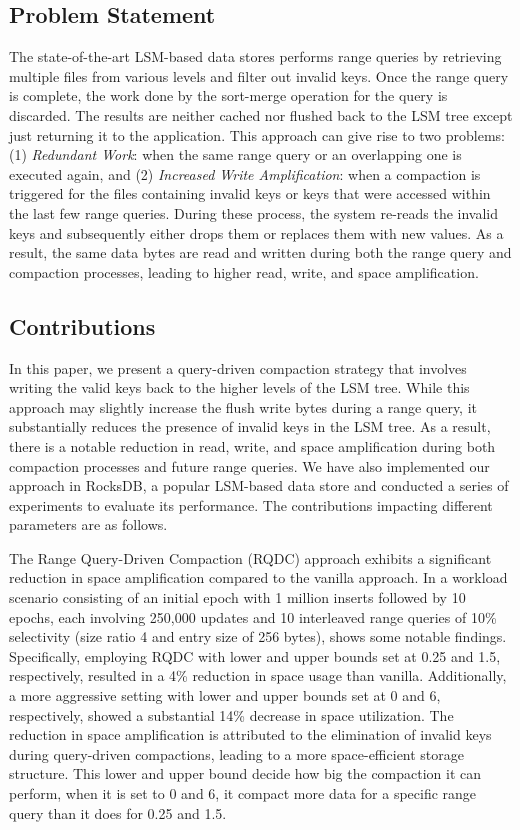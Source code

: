 \subsection{Problem Statement}
The state-of-the-art LSM-based data stores performs range queries by retrieving multiple files from various levels and 
filter out invalid keys. Once the range query is complete, the work done by the sort-merge operation for the query is 
discarded. The results are neither cached nor flushed back to the LSM tree except just returning it to the application. This 
approach can give rise to two problems: (1) \textit{Redundant Work}: when the same range query or 
an overlapping one is executed again, and (2) \textit{Increased Write Amplification}: when a compaction is triggered 
for the files containing invalid keys or keys that were accessed within the last few range queries. During these process, 
the system re-reads the invalid keys and subsequently either drops them or replaces them with new values. As a result, 
the same data bytes are read and written during both the range query and compaction processes, leading to higher read, 
write, and space amplification.


\subsection{Contributions}
In this paper, we present a query-driven compaction strategy that involves writing the valid keys back to the higher 
levels of the LSM tree. While this approach may slightly increase the flush write bytes during a range query, it 
substantially reduces the presence of invalid keys in the LSM tree. As a result, there is a notable reduction in read, 
write, and space amplification during both compaction processes and future range queries. We have also implemented our
approach in RocksDB, a popular LSM-based data store and conducted a series of experiments to evaluate its performance.
The contributions impacting different parameters are as follows.

The Range Query-Driven Compaction (RQDC) approach exhibits a significant reduction in space amplification compared to 
the vanilla approach. In a workload scenario consisting of an initial epoch with 1 million inserts followed by 10 
epochs, each involving 250,000 updates and 10 interleaved range queries of 10\% selectivity (size ratio 4 and entry size of 256 bytes), 
shows some notable findings. Specifically, employing RQDC with lower and upper bounds set at 0.25 and 1.5, 
respectively, resulted in a 4\% reduction in space usage than vanilla. Additionally, a more aggressive setting with lower and upper 
bounds set at 0 and 6, respectively, showed a substantial 14\% decrease in space utilization. The reduction in space 
amplification is attributed to the elimination of invalid keys during query-driven compactions, leading to a more 
space-efficient storage structure. This lower and upper bound decide how big the compaction it can perform, when it is set
to 0 and 6, it compact more data for a specific range query than it does for 0.25 and 1.5.

